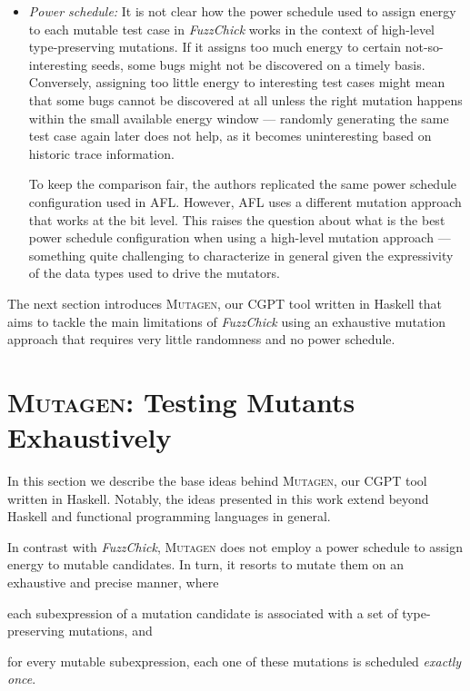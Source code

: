\documentclass[acmsmall, anonymous]{acmart}
\newcommand{\fuzzchick}{\textit{FuzzChick}\xspace}
\newcommand{\mutagen}{\textsc{Mutagen}\xspace}
\begin{document}
\begin{itemize}
\item \emph{Power schedule:}
%
It is not clear how the power schedule used to assign energy to each mutable
test case in \fuzzchick works in the context of high-level type-preserving
mutations.
%
If it assigns too much energy to certain not-so-interesting seeds, some bugs
might not be discovered on a timely basis.
%
Conversely, assigning too little energy to interesting test cases might mean
that some bugs cannot be discovered at all unless the right mutation happens
within the small available energy window --- randomly generating the same test
case again later does not help, as it becomes uninteresting based on historic
trace information.

To keep the comparison fair, the authors replicated the same power schedule
configuration used in AFL.
%
However, AFL uses a different mutation approach that works at the bit level.
%
This raises the question about what is the best power schedule configuration
when using a high-level mutation approach --- something quite challenging to
characterize in general given the expressivity of the data types used to drive
the mutators.\\

\end{itemize}


The next section introduces \mutagen, our CGPT tool written in Haskell that aims
to tackle the main limitations of \fuzzchick using an exhaustive mutation
approach that requires very little randomness and no power schedule.


\section{\mutagen: Testing Mutants Exhaustively}
\label{sec:mutagen}

In this section we describe the base ideas behind \mutagen, our CGPT tool
written in Haskell.
%
Notably, the ideas presented in this work extend beyond Haskell and functional
programming languages in general.
%

In contrast with \fuzzchick, \mutagen does not employ a power schedule to assign
energy to mutable candidates.
%
In turn, it resorts to mutate them on an exhaustive and precise manner, where
%
\begin{inparaenum}
  \item each subexpression of a mutation candidate is associated with a set of
    type-preserving mutations, and
  \item for every mutable subexpression, each one of these mutations is
    scheduled \emph{exactly once}.
\end{inparaenum}
%
\end{document}
